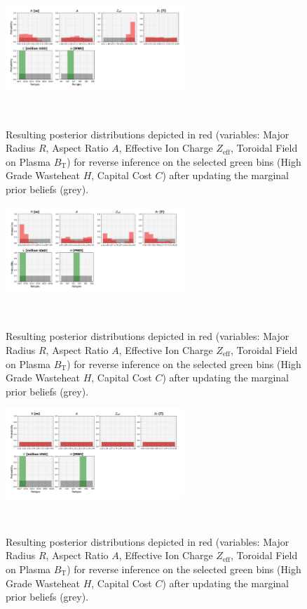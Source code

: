 \begin{figure}[ht]
    \centering
    \includegraphics[width=0.6\textwidth]{figures/TE_results/march_data/config(57)_2outputs_2.png}
    \caption{Resulting posterior distributions depicted in red (variables: Major Radius $R$, Aspect Ratio $A$, Effective Ion Charge $Z_{\text{eff}}$, Toroidal Field on Plasma $B_{\text{T}}$) for reverse
    inference on the selected green bins (High Grade Wasteheat $H$, Capital Cost $C$) after updating the marginal prior beliefs (grey).}~\label{fig:config(57)_2outputs_2}
\end{figure}

\begin{figure}[ht]
    \centering
    \includegraphics[width=0.6\textwidth]{figures/TE_results/march_data/config(57)_2outputs_3.png}
    \caption{Resulting posterior distributions depicted in red (variables: Major Radius $R$, Aspect Ratio $A$, Effective Ion Charge $Z_{\text{eff}}$, Toroidal Field on Plasma $B_{\text{T}}$) for reverse
    inference on the selected green bins (High Grade Wasteheat $H$, Capital Cost $C$) after updating the marginal prior beliefs (grey).}~\label{fig:config(57)_2outputs_3}
\end{figure}

\begin{figure}[ht]
    \centering
    \includegraphics[width=0.6\textwidth]{figures/TE_results/march_data/config(57)_2outputs_4.png}
    \caption{Resulting posterior distributions depicted in red (variables: Major Radius $R$, Aspect Ratio $A$, Effective Ion Charge $Z_{\text{eff}}$, Toroidal Field on Plasma $B_{\text{T}}$) for reverse
    inference on the selected green bins (High Grade Wasteheat $H$, Capital Cost $C$) after updating the marginal prior beliefs (grey).}~\label{fig:config(57)_2outputs_4}
\end{figure}

